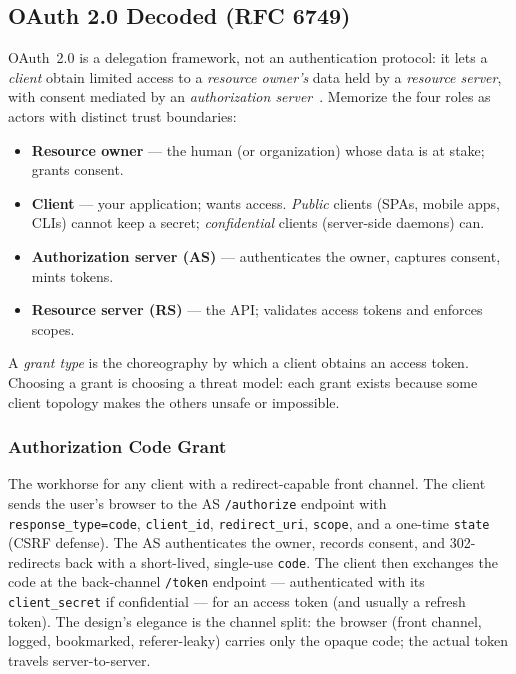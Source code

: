 \subsection{OAuth 2.0 Decoded (RFC 6749)}
\label{sec:ch5-oauth}

OAuth~2.0 is a delegation framework, not an authentication protocol: it lets
a \emph{client} obtain limited access to a \emph{resource owner's} data held
by a \emph{resource server}, with consent mediated by an
\emph{authorization server}~\cite{rfc6749}. Memorize the four roles as
actors with distinct trust boundaries:

\begin{itemize}
  \item \textbf{Resource owner} --- the human (or organization) whose data
        is at stake; grants consent.
  \item \textbf{Client} --- your application; wants access. \emph{Public}
        clients (SPAs, mobile apps, CLIs) cannot keep a secret;
        \emph{confidential} clients (server-side daemons) can.
  \item \textbf{Authorization server (AS)} --- authenticates the owner,
        captures consent, mints tokens.
  \item \textbf{Resource server (RS)} --- the API; validates access tokens
        and enforces scopes.
\end{itemize}

\begin{definition}
A \emph{grant type} is the choreography by which a client obtains an access
token. Choosing a grant is choosing a threat model: each grant exists
because some client topology makes the others unsafe or impossible.
\end{definition}

\subsubsection{Authorization Code Grant}

The workhorse for any client with a redirect-capable front channel. The
client sends the user's browser to the AS \texttt{/authorize} endpoint with
\texttt{response\_type=code}, \texttt{client\_id},
\texttt{redirect\_uri}, \texttt{scope}, and a one-time \texttt{state}
(CSRF defense). The AS authenticates the owner, records consent, and
302-redirects back with a short-lived, single-use \texttt{code}. The client
then exchanges the code at the back-channel \texttt{/token} endpoint ---
authenticated with its \texttt{client\_secret} if confidential --- for an
access token (and usually a refresh token). The design's elegance is the
channel split: the browser (front channel, logged, bookmarked, referer-leaky)
carries only the opaque code; the actual token travels server-to-server.

